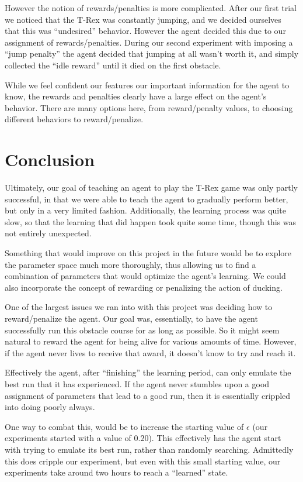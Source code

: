 \documentclass{scrartcl}
\begin{document}
    However the notion of rewards/penalties is more complicated. After our
    first trial we noticed that the T-Rex was constantly jumping, and we decided
    ourselves that this was ``undesired'' behavior. However the agent decided
    this due to our assignment of rewards/penalties. During our second
    experiment with imposing a ``jump penalty'' the agent decided that jumping
    at all wasn't worth it, and simply collected the ``idle reward'' until it
    died on the first obstacle.

    While we feel confident our features our important information for the agent
    to know, the rewards and penalties clearly have a large effect on the
    agent's behavior. There are many options here, from reward/penalty values,
    to choosing different behaviors to reward/penalize.

\section{Conclusion}
    Ultimately, our goal of teaching an agent to play the T-Rex game was only
    partly successful, in that we were able to teach the agent to gradually
    perform better, but only in a very limited fashion. Additionally, the
    learning process was quite slow, so that the learning that did happen took
    quite some time, though this was not entirely unexpected.

    Something that would improve on this project in the future would be to
    explore the parameter space much more thoroughly, thus allowing us to find
    a combination of parameters that would optimize the agent's learning. We
    could also incorporate the concept of rewarding or penalizing the action of
    ducking.

    One of the largest issues we ran into with this project was deciding how to
    reward/penalize the agent. Our goal was, essentially, to have the agent
    successfully run this obstacle course for as long as possible. So it might
    seem natural to reward the agent for being alive for various amounts of
    time. However, if the agent never lives to receive that award, it doesn't
    know to try and reach it.

    Effectively the agent, after ``finishing'' the learning period, can only
    emulate the best run that it has experienced. If the agent never stumbles
    upon a good assignment of parameters that lead to a good run, then it is
    essentially crippled into doing poorly always.

    One way to combat this, would be to increase the starting value of
    $\epsilon$ (our experiments started with a value of $0.20$). This
    effectively has the agent start with trying to emulate its best run, rather
    than randomly searching. Admittedly this does cripple our experiment, but
    even with this small starting value, our experiments take around two hours
    to reach a ``learned'' state.



\end{document}
